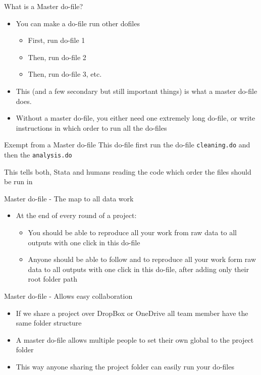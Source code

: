 \documentclass[aspectratio=169]{beamer}
\newcommand{\codeexample}[2]{
	\begin{figure}
		\VerbatimInput[
		framesep=3mm,
		frame=lines, %
		numbers=left, %
		label= #1, %
		baselinestretch=0.90, %
		]{#2} %
	\end{figure}
	\FloatBarrier
}
\begin{document}
\begin{frame}{What is a Master do-file?}
	\begin{itemize}
		\item You can make a do-file run other dofiles
			\begin{itemize}
				\item First, run do-file 1
				\item Then, run do-file 2
				\item Then, run do-file 3, etc.
			\end{itemize}
		\item This (and a few secondary but still important things) is what a master do-file does.
		\item Without a master do-file, you either need one extremely long do-file, or write instructions in which order to run all the do-files
	\end{itemize}
\end{frame}

\begin{frame}{Exempt from a Master do-file}
	This do-file first run the do-file \texttt{cleaning.do} and then the \texttt{analysis.do}
		\codeexample{run-do-from-do.do}{code/run-do-from-do.do}
	This tells both, Stata and humans reading the code which order the files should be run in
\end{frame}


\begin{frame}{Master do-file - The map to all data work}
	\begin{itemize}
		\item At the end of every round of a project:
		\begin{itemize}
			\item 	You should be able to reproduce all your work from raw data to all outputs with one click in this do-file
			\item Anyone should be able to follow and to reproduce all your work form raw data to all outputs with one click in this do-file, after adding only their root folder path
		\end{itemize}
	\end{itemize}
\end{frame}

\begin{frame}[fragile]{Master do-file - Allows easy collaboration}
	\begin{itemize}
		\item If we share a project over DropBox or OneDrive all team member have the same folder structure
		\item A master do-file allows multiple people to set their own global to the project folder
		\item This way anyone sharing the project folder can easily run your do-files
	\end{itemize}
\end{frame}
\end{document}
